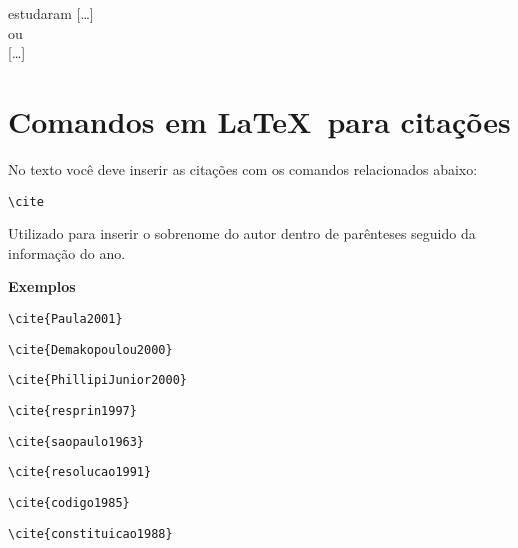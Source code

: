   estudaram [\ldots]\\
	
ou\\

[\ldots] \cite{Ando1990,Ferreira1989,SilvaRibeiro2001}  \\


\section{Comandos em \LaTeX\ para citações}


No texto voc\^e deve inserir as citações com os comandos relacionados abaixo:

\begin{alineas}
\item
\begin{verbatim}
\cite
\end{verbatim}

Utilizado para inserir o sobrenome do autor dentro de par\^enteses seguido da informação do ano.

\textbf{Exemplos} 

\begin{verbatim}
\cite{Paula2001}
\end{verbatim}
\cite{Paula2001}

\begin{verbatim}
\cite{Demakopoulou2000}
\end{verbatim}
\cite{Demakopoulou2000}

\begin{verbatim}
\cite{PhillipiJunior2000}
\end{verbatim}
\cite{PhillipiJunior2000}

\begin{verbatim}
\cite{resprin1997}
\end{verbatim}
\cite{resprin1997}

\begin{verbatim}
\cite{saopaulo1963}
\end{verbatim}
\cite{saopaulo1963}

\begin{verbatim}
\cite{resolucao1991}
\end{verbatim}
\cite{resolucao1991}

\begin{verbatim}
\cite{codigo1985}
\end{verbatim}
\cite{codigo1985}

\begin{verbatim}
\cite{constituicao1988}
\end{verbatim}
\cite{constituicao1988}


\end{alineas}
